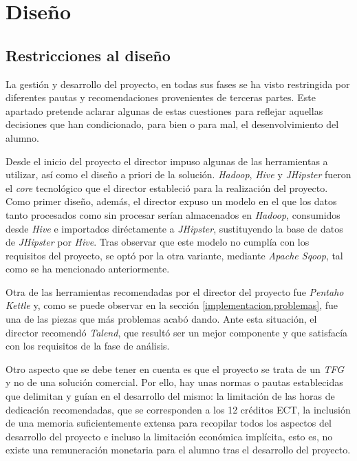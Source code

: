 \chapter{Diseño}  \label{disenyo}


\section{Restricciones al diseño} \label{disenyo.restricciones}
La gestión y desarrollo del proyecto, en todas sus fases se ha visto restringida por diferentes pautas y recomendaciones provenientes de terceras partes. Este apartado pretende aclarar algunas de estas cuestiones para reflejar aquellas decisiones que han condicionado, para bien o para mal, el desenvolvimiento del alumno. 
\par Desde el inicio del proyecto el director impuso algunas de las herramientas a utilizar, así como el diseño a priori de la solución. \textit{Hadoop}, \textit{Hive} y \textit{JHipster} fueron el \textit{core} tecnológico que el director estableció para la realización del proyecto. Como primer diseño, además, el director expuso un modelo en el que los datos tanto procesados como sin procesar serían almacenados en \textit{Hadoop}, consumidos desde \textit{Hive} e importados diréctamente a \textit{JHipster}, sustituyendo la base de datos de \textit{JHipster} por \textit{Hive}. Tras observar que este modelo no cumplía con los requisitos del proyecto, se optó por la otra variante, mediante \textit{Apache Sqoop}, tal como se ha mencionado anteriormente. 
\par Otra de las herramientas recomendadas por el director del proyecto fue \textit{Pentaho Kettle} y, como se puede observar en la sección \ref{implementacion.problemas}, fue una de las piezas que más problemas acabó dando. Ante esta situación, el director recomendó \textit{Talend}, que resultó ser un mejor componente y que satisfacía con los requisitos de la fase de análisis.
\par Otro aspecto que se debe tener en cuenta es que el proyecto se trata de un \textit{TFG} y no de una solución comercial. Por ello, hay unas normas o pautas  establecidas que delimitan y guían en el desarrollo del mismo: la limitación de las horas de dedicación recomendadas, que se corresponden a los 12 créditos ECT, la inclusión de una memoria suficientemente extensa para recopilar todos los aspectos del desarrollo del proyecto e incluso la limitación económica implícita, esto es, no existe una remuneración monetaria para el alumno tras el desarrollo del proyecto. 

